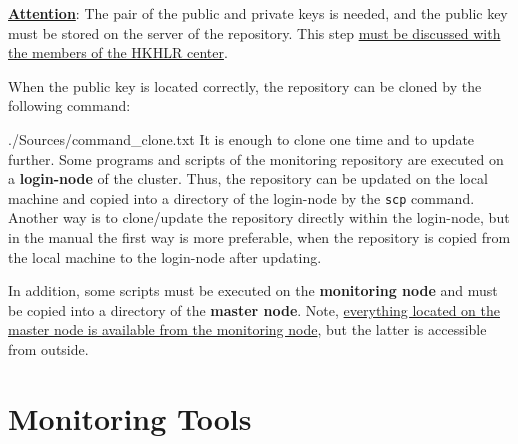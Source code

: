 \documentclass[12pt,a4paper,onecolumn]{article}
\begin{document}
\underline{\textbf{Attention}}: The pair of the public and private keys is needed, and the public key must be stored on the server of the repository.
This step \ul{must be discussed with the members of the HKHLR center}.
\vspace{\baselineskip}

When the public key is located correctly, the repository can be cloned by the following command:

{./Sources/command_clone.txt}
It is enough to clone one time and to update further.
Some programs and scripts of the monitoring repository are executed on a \textbf{login-node} of the cluster.
Thus, the repository can be updated on the local machine and copied into a directory of the login-node by the \lstinline{scp} command.
Another way is to clone/update the repository directly within the login-node, but in the manual the first way is more preferable, when the repository is copied from the local machine to the login-node after updating.

In addition, some scripts must be executed on the \textbf{monitoring node} and must be copied into a directory of the \textbf{master node}.
Note, \ul{everything located on the master node is available from the monitoring node}, but the latter is accessible from outside.


\section{Monitoring Tools}
\label{sec:monitoring_tools}

\end{document}
